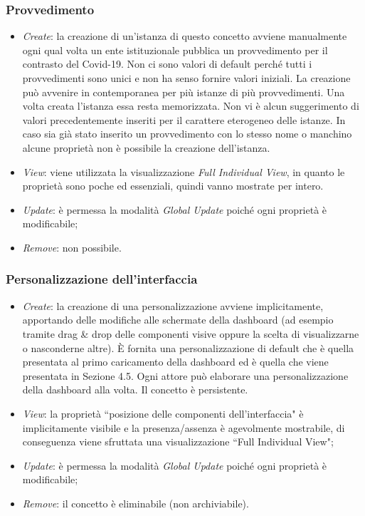 \subsubsection{Provvedimento}
\begin{itemize}
    \item \textit{Create}: la creazione di un'istanza di questo concetto avviene manualmente ogni qual volta un ente istituzionale pubblica un provvedimento per il contrasto del Covid-19.
    Non ci sono valori di default perché tutti i provvedimenti sono unici e non ha senso fornire valori iniziali.
    La creazione può avvenire in contemporanea per più istanze di più provvedimenti.
    Una volta creata l'istanza essa resta memorizzata.
    Non vi è alcun suggerimento di valori precedentemente inseriti per il carattere eterogeneo delle istanze.
    In caso sia già stato inserito un provvedimento con lo stesso nome o manchino alcune proprietà non è possibile la creazione dell'istanza.
    \item \textit{View}: viene utilizzata la visualizzazione \textit{Full Individual View}, in quanto le proprietà sono poche ed essenziali, quindi vanno mostrate per intero.
    \item \textit{Update}: è permessa la modalità \textit{Global Update} poiché ogni proprietà è modificabile;
    \item \textit{Remove}: non possibile.
\end{itemize}

\subsubsection{Personalizzazione dell'interfaccia}
\begin{itemize}
    \item \textit{Create}: la creazione di una personalizzazione avviene implicitamente, apportando delle modifiche alle schermate della dashboard (ad esempio tramite drag \& drop delle componenti visive oppure la scelta di visualizzarne o nasconderne altre).
    È fornita una personalizzazione di default che è quella presentata al primo caricamento della dashboard ed è quella che viene presentata in Sezione 4.5.
    Ogni attore può elaborare una personalizzazione della dashboard alla volta.
    Il concetto è persistente.
    \item \textit{View}: la proprietà ``posizione delle componenti dell'interfaccia" è implicitamente visibile e la presenza/assenza è agevolmente mostrabile, di conseguenza viene sfruttata una visualizzazione ``Full Individual View";
    \item \textit{Update}: è permessa la modalità \textit{Global Update} poiché ogni proprietà è modificabile;
    \item \textit{Remove}: il concetto è eliminabile (non archiviabile).
\end{itemize}